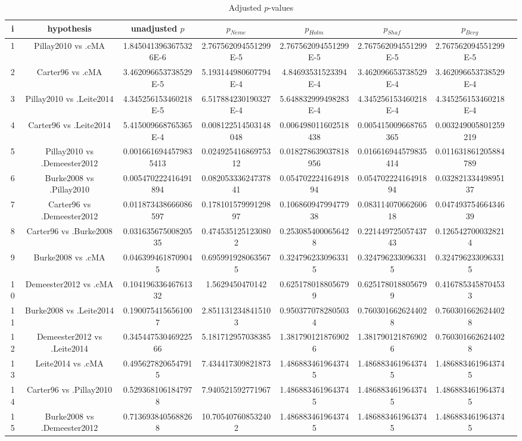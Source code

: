 \documentclass[a4paper,10pt]{article}
\begin{document}
\begin{landscape}
\begin{table}[!htp]
\centering\tiny
\caption{Adjusted $p$-values}
\begin{tabular}{cccccccc}
i&hypothesis&unadjusted $p$&$p_{Neme}$&$p_{Holm}$&$p_{Shaf}$&$p_{Berg}$\\
\hline
1&Pillay2010 vs .cMA&1.8450413963675326E-6&2.767562094551299E-5&2.767562094551299E-5&2.767562094551299E-5&2.767562094551299E-5\\
2&Carter96 vs .cMA&3.462096653738529E-5&5.193144980607794E-4&4.84693531523394E-4&3.462096653738529E-4&3.462096653738529E-4\\
3&Pillay2010 vs .Leite2014&4.345256153460218E-5&6.517884230190327E-4&5.648832999498283E-4&4.345256153460218E-4&4.345256153460218E-4\\
4&Carter96 vs .Leite2014&5.415009668765365E-4&0.008122514503148048&0.006498011602518438&0.005415009668765365&0.003249005801259219\\
5&Pillay2010 vs .Demeester2012&0.0016616944579835413&0.02492541686975312&0.018278639037818956&0.016616944579835414&0.011631861205884789\\
6&Burke2008 vs .Pillay2010&0.005470222416491894&0.08205333624737841&0.05470222416491894&0.05470222416491894&0.03282133449895137\\
7&Carter96 vs .Demeester2012&0.011873438666086597&0.17810157999129897&0.10686094799477938&0.08311407066260618&0.04749375466434639\\
8&Carter96 vs .Burke2008&0.03163567500820535&0.4745351251230802&0.2530854000656428&0.22144972505743743&0.1265427000328214\\
9&Burke2008 vs .cMA&0.0463994618709045&0.6959919280635675&0.3247962330963315&0.3247962330963315&0.3247962330963315\\
10&Demeester2012 vs .cMA&0.10419633646761332&1.5629450470142&0.6251780188056799&0.6251780188056799&0.4167853458704533\\
11&Burke2008 vs .Leite2014&0.1900754156561007&2.8511312348415103&0.9503770782805034&0.7603016626244028&0.7603016626244028\\
12&Demeester2012 vs .Leite2014&0.34544753046922566&5.181712957038385&1.3817901218769026&1.3817901218769026&0.7603016626244028\\
13&Leite2014 vs .cMA&0.4956278206547915&7.434417309821873&1.4868834619643745&1.4868834619643745&1.4868834619643745\\
14&Carter96 vs .Pillay2010&0.5293681061847978&7.940521592771967&1.4868834619643745&1.4868834619643745&1.4868834619643745\\
15&Burke2008 vs .Demeester2012&0.7136938405688268&10.705407608532402&1.4868834619643745&1.4868834619643745&1.4868834619643745\\
\hline
\end{tabular}
\end{table}

\end{landscape}
\end{document}
